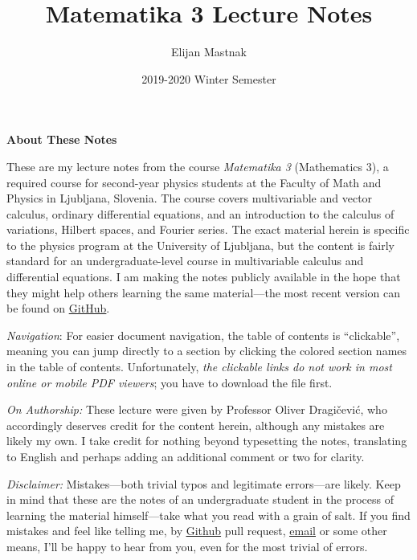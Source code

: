 \documentclass[11pt, a4paper]{article}
\begin{document}
\title{Matematika 3 Lecture Notes}
\author{Elijan Mastnak}
\date{2019-2020 Winter Semester}
\maketitle


\begin{center}
\textbf{About These Notes}
\end{center}
These are my lecture notes from the course \textit{Matematika 3} (Mathematics 3), a required course for second-year physics students at the Faculty of Math and Physics in Ljubljana, Slovenia. The course covers  multivariable and vector calculus, ordinary differential equations, and an introduction to the calculus of variations, Hilbert spaces, and Fourier series. The exact material herein is specific to the physics program at the University of Ljubljana, but the content is fairly standard for an undergraduate-level course in multivariable calculus and differential equations. I am making the notes publicly available in the hope that they might help others learning the same material---the most recent version can be found on \href{https://github.com/ejmastnak/fmf/tree/main/math-3}{\underline{GitHub}}.

\vspace{2mm}
\textit{Navigation}: For easier document navigation, the table of contents is ``clickable'', meaning you can jump directly to a section by clicking the colored section names in the table of contents. Unfortunately, \textit{the clickable links do not work in most online or mobile PDF viewers}; you have to download the file first.


\vspace{2mm}
\textit{On Authorship:} These lecture were given by Professor Oliver Dragi\v{c}evi\'{c}, who accordingly deserves credit for the content herein, although any mistakes are likely my own. I take credit for nothing beyond typesetting the notes, translating to English and perhaps adding an additional comment or two for clarity.

\vspace{2mm}
\textit{Disclaimer:} Mistakes---both trivial typos and legitimate errors---are likely. Keep in mind that these are the notes of an undergraduate student in the process of learning the material himself---take what you read with a grain of salt. If you find mistakes and feel like telling me, by \href{https://github.com/ejmastnak/fmf}{\underline{Github}} pull request, \href{mailto:ejmastnak@gmail.com}{\underline{email}} or some other means, I'll be happy to hear from you, even for the most trivial of errors.
\end{document}
